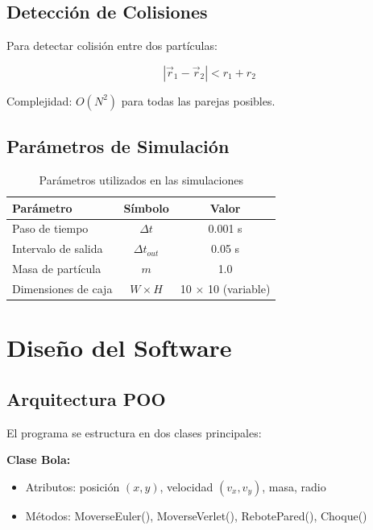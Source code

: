 \documentclass[12pt,a4paper]{article}
\begin{document}
\subsection{Detección de Colisiones}

Para detectar colisión entre dos partículas:

\begin{equation}
|\vec{r}_1 - \vec{r}_2| < r_1 + r_2
\end{equation}

Complejidad: $O(N^2)$ para todas las parejas posibles.

\subsection{Parámetros de Simulación}

\begin{table}[H]
\centering
\caption{Parámetros utilizados en las simulaciones}
\begin{tabular}{|l|c|c|}
\hline
\textbf{Parámetro} & \textbf{Símbolo} & \textbf{Valor} \\
\hline
Paso de tiempo & $\Delta t$ & 0.001 s \\
Intervalo de salida & $\Delta t_{out}$ & 0.05 s \\
Masa de partícula & $m$ & 1.0 \\
Dimensiones de caja & $W \times H$ & 10 $\times$ 10 (variable) \\
\hline
\end{tabular}
\end{table}

\section{Diseño del Software}

\subsection{Arquitectura POO}

El programa se estructura en dos clases principales:

\textbf{Clase Bola:}
\begin{itemize}
    \item Atributos: posición $(x,y)$, velocidad $(v_x, v_y)$, masa, radio
    \item Métodos: MoverseEuler(), MoverseVerlet(), RebotePared(), Choque()
\end{itemize}
\end{document}
